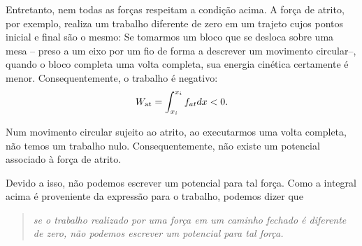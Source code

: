 Entretanto, nem todas as forças respeitam a condição acima. A força de atrito, por exemplo, realiza um trabalho diferente de zero em um trajeto cujos pontos inicial e final são o mesmo: Se tomarmos um bloco que se desloca sobre uma mesa -- preso a um eixo por um fio de forma a descrever um movimento circular--, quando o bloco completa uma volta completa, sua energia cinética certamente é menor. Consequentemente, o trabalho é negativo:
\begin{equation}
  W_{\rm{at}} = \int_{x_i}^{x_i} f_{at} dx < 0.
\end{equation}

\begin{marginfigure}[-5cm]
\centering
{}
\caption{Num movimento circular sujeito ao atrito, ao executarmos uma volta completa, não temos um trabalho nulo. Consequentemente, não existe um potencial associado à força de atrito.}
\end{marginfigure}

\noindent{}Devido a isso, não podemos escrever um potencial para tal força. Como a integral acima é proveniente da expressão para o trabalho, podemos dizer que
\begin{quote}
\emph{se o trabalho realizado por uma força em um caminho fechado é diferente de zero, não podemos escrever um potencial para tal força.}
\end{quote}

